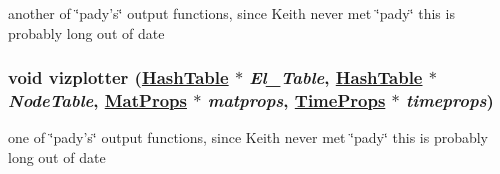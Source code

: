 another of \char`\"{}pady's\char`\"{} output functions, since Keith never met \char`\"{}pady\char`\"{} this is probably long out of date 

\hypertarget{tecplot_8C_a14}{
\subsubsection[vizplotter]{\setlength{\rightskip}{0pt plus 5cm}void vizplotter (\hyperlink{classHashTable}{Hash\-Table} $\ast$ {\em El\_\-Table}, \hyperlink{classHashTable}{Hash\-Table} $\ast$ {\em Node\-Table}, \hyperlink{structMatProps}{Mat\-Props} $\ast$ {\em matprops}, \hyperlink{structTimeProps}{Time\-Props} $\ast$ {\em timeprops})}}
\label{tecplot_8C_a14}


one of \char`\"{}pady's\char`\"{} output functions, since Keith never met \char`\"{}pady\char`\"{} this is probably long out of date 

